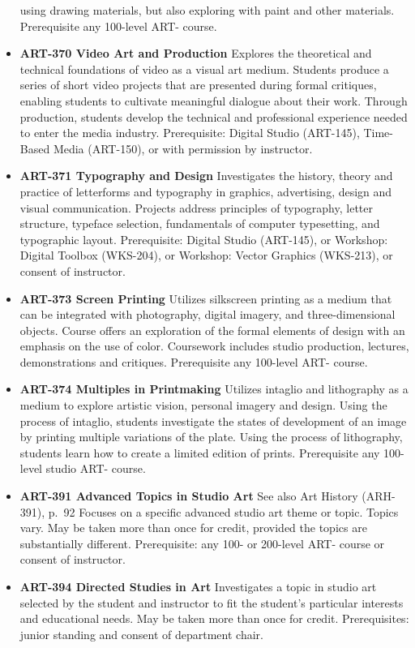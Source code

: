 \documentclass[
  letterpaper,
]{scrbook}
\begin{document}
\begin{itemize}
  using drawing materials, but also exploring with paint and other
  materials. Prerequisite any 100-level ART- course.
\item
  \textbf{ART-370 Video Art and Production} Explores the theoretical and
  technical foundations of video as a visual art medium. Students
  produce a series of short video projects that are presented during
  formal critiques, enabling students to cultivate meaningful dialogue
  about their work. Through production, students develop the technical
  and professional experience needed to enter the media industry.
  Prerequisite: Digital Studio (ART-145), Time-Based Media (ART-150), or
  with permission by instructor.
\item
  \textbf{ART-371 Typography and Design} Investigates the history,
  theory and practice of letterforms and typography in graphics,
  advertising, design and visual communication. Projects address
  principles of typography, letter structure, typeface selection,
  fundamentals of computer typesetting, and typographic layout.
  Prerequisite: Digital Studio (ART-145), or Workshop: Digital Toolbox
  (WKS-204), or Workshop: Vector Graphics (WKS-213), or consent of
  instructor.
\item
  \textbf{ART-373 Screen Printing} Utilizes silkscreen printing as a
  medium that can be integrated with photography, digital imagery, and
  three-dimensional objects. Course offers an exploration of the formal
  elements of design with an emphasis on the use of color. Coursework
  includes studio production, lectures, demonstrations and critiques.
  Prerequisite any 100-level ART- course.
\item
  \textbf{ART-374 Multiples in Printmaking} Utilizes intaglio and
  lithography as a medium to explore artistic vision, personal imagery
  and design. Using the process of intaglio, students investigate the
  states of development of an image by printing multiple variations of
  the plate. Using the process of lithography, students learn how to
  create a limited edition of prints. Prerequisite any 100-level studio
  ART- course.
\item
  \textbf{ART-391 Advanced Topics in Studio Art} See also Art History
  (ARH-391), p.~92 Focuses on a specific advanced studio art theme or
  topic. Topics vary. May be taken more than once for credit, provided
  the topics are substantially different. Prerequisite: any 100- or
  200-level ART- course or consent of instructor.
\item
  \textbf{ART-394 Directed Studies in Art} Investigates a topic in
  studio art selected by the student and instructor to fit the student's
  particular interests and educational needs. May be taken more than
  once for credit. Prerequisites: junior standing and consent of
  department chair.
\end{itemize}
\end{document}
